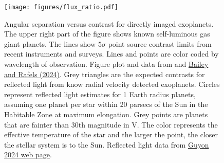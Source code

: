 \documentclass[letterpaper]{ar-1col}
\newcommand{\ld}{$\lambda/D$}
\begin{document}
\begin{figure}[ht]
  \centering
  \texttt{[image: figures/flux\_ratio.pdf]}
  \caption{Angular separation versus contrast for directly imaged exoplanets.
  The upper right part of the figure shows known self-luminous gas giant planets.
  The lines show  $5\sigma$ point source contrast limits from recent instruments and surveys.
  Lines and points are color coded by wavelength of observation. 
  Figure plot and data from \citet{Bailey24} and \href{https://github.com/nasavbailey/DI-flux-ratio-plot}{Bailey and Rafels (2024)}.
  Grey triangles are the expected contrasts for reflected light from know radial velocity detected exoplanets.
  Circles represent reflected light estimates for 1 Earth radius planets, assuming one planet per star within 20 parsecs of the Sun in the Habitable Zone at maximum elongation.
  Grey points are planets that are fainter than 30th magnitude in V.
  The color represents the effective temperature of the star and the larger the point, the closer the stellar system is to the Sun.
  Reflected light data from \href{https://subarutelescope.org/staff/guyon/04research.web/14hzplanetsELTs.web/catalog.web/content.html}{Guyon 2024 web page}.  
}
\end{figure}
\end{document}
